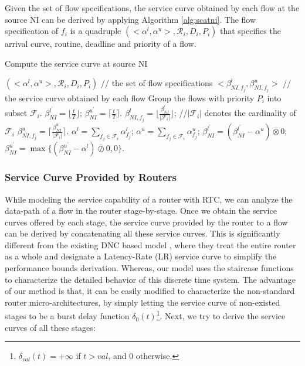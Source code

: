 \documentclass[preprint]{elsarticle}
\begin{document}
Given the set of flow specifications, the service curve obtained by each flow at the source NI can be derived by applying Algorithm \ref{alg:scatni}. The flow specification of $f_i$ is a quadruple $(<\alpha^l,\alpha^u>,\mathcal{R}_i,D_i,P_i)$ that specifies the arrival curve, routine, deadline and priority of a flow.
\begin{algorithm}
\caption{Compute the service curve at source NI}\label{alg:scatni}
\begin{algorithmic}[1]
\Require $(<\alpha^l,\alpha^u>,\mathcal{R}_i,D_i,P_i)$ // the set of flow specifications
\Ensure $<\beta_{NI,f_j}^l,\beta_{NI,f_j}^u>$ // the service curve obtained by each flow
\State Group the flows with priority $P_i$ into subset $\mathcal{F}_i$.
\State $\beta_{NI}^{l^\prime}=\lfloor\frac{t}{T}\rfloor$; $\beta_{NI}^{u^\prime}=\lceil\frac{t}{T}\rceil$.
        \State $\beta_{NI,f_j}^l=\lfloor\frac{\beta_{NI}^{l^\prime}}{|\mathcal{F}_i|}\rfloor$; //$|\mathcal{F}_i|$ denotes the cardinality of $\mathcal{F}_i$
        \State $\beta_{NI,f_j}^u=\lceil\frac{\beta_{NI}^{u^\prime}}{|\mathcal{F}_i|}\rceil$.
    \EndFor
    \State $\alpha^l=\sum_{f_j\in \mathcal{F}_i}\alpha^l_{f_j}$; $\alpha^u=\sum_{f_j\in \mathcal{F}_i}\alpha^u_{f_j}$;
    \State $\beta_{NI}^{l^\prime}=(\beta_{NI}^{l^\prime}-\alpha^u)\bar{\otimes}0$; $\beta_{NI}^{u^\prime}=\max\{(\beta_{NI}^{u^\prime}-\alpha^l)\bar{\oslash}0,0\}$.
\EndFor
\end{algorithmic}
\end{algorithm}

\subsubsection{Service Curve Provided by Routers}\label{router}
While modeling the service capability of a router with RTC, we can analyze the data-path of a flow in the router stage-by-stage. Once we obtain the service curves offered by each stage, the service curve provided by the router to a flow can be derived by concatenating all these service curves. This is significantly different from the existing DNC based model \cite{qian2009analysis,Qian489900}, where they treat the entire router as a whole and designate a Latency-Rate (LR) service curve \cite{Boudec2001Network} to simplify the performance bounds derivation. Whereas, our model uses the staircase functions to characterize the detailed behavior of this discrete time system. The advantage of our method is that, it can be easily modified to characterize the non-standard router micro-architectures, by simply letting the service curve of non-existed stages to be a burst delay function $\delta_0(t)$\footnote{$\delta_{val}(t)=+\infty$ if $t>val$, and 0 otherwise.}. Next, we try to derive the service curves of all these stages:
\end{document}
